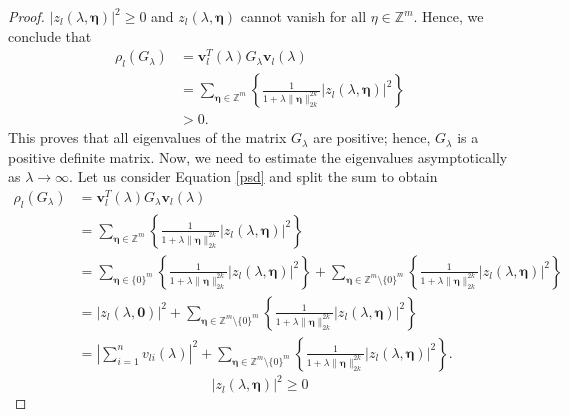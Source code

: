\documentclass[multixcb]{amstext-l}
\theoremstyle{plain}
\theoremstyle{definition}
\theoremstyle{definition}
\theoremstyle{remark}
\numberwithin{equation}{chapter}
\begin{document}
\begin{proof}
$\left|z_l(\lambda,\boldsymbol{\eta})\right|^2 \ge 0$ and $z_l(\lambda,\boldsymbol{\eta})$ cannot vanish for all $\eta\in\mathbb{Z}^m$. Hence, we conclude that
\begin{equation}\label{psd}
\begin{aligned}
   \rho_l(G_{\lambda}) &= \boldsymbol{v}_l^T(\lambda)G_{\lambda}\boldsymbol{v}_l(\lambda)\\
        &= \sum_{\boldsymbol{\eta}\in\mathbb{Z}^m}\left\{ \frac{1}{1+\lambda\|\boldsymbol{\eta}\|_{2k}^{2k}}\left|z_l(\lambda,\boldsymbol{\eta})\right|^2 \right\}\\
        &> 0.
\end{aligned}
\end{equation}
This proves that all eigenvalues of the matrix $G_{\lambda}$ are positive; hence, $G_{\lambda}$ is a positive definite matrix. Now, we need to estimate the eigenvalues asymptotically as $\lambda\to\infty$. Let us consider Equation \ref{psd} and split the sum to obtain
\begin{equation}\label{psd2}
\begin{aligned}
   \rho_l(G_{\lambda}) &= \boldsymbol{v}_l^T(\lambda)G_{\lambda}\boldsymbol{v}_l(\lambda)\\
        &= \sum_{\boldsymbol{\eta}\in\mathbb{Z}^m}\left\{ \frac{1}{1+\lambda\|\boldsymbol{\eta}\|_{2k}^{2k}}\left|z_l(\lambda,\boldsymbol{\eta})\right|^2 \right\}\\
            &= \sum_{\boldsymbol{\eta}\in\{0\}^m}\left\{ \frac{1}{1+\lambda\|\boldsymbol{\eta}\|_{2k}^{2k}}\left|z_l(\lambda,\boldsymbol{\eta})\right|^2 \right\} + \sum_{\boldsymbol{\eta}\in\mathbb{Z}^m\setminus\{0\}^m}\left\{ \frac{1}{1+\lambda\|\boldsymbol{\eta}\|_{2k}^{2k}}\left|z_l(\lambda,\boldsymbol{\eta})\right|^2 \right\}\\
            &= \left|z_l(\lambda,\boldsymbol{0})\right|^2 + \sum_{\boldsymbol{\eta}\in\mathbb{Z}^m\setminus\{0\}^m}\left\{ \frac{1}{1+\lambda\|\boldsymbol{\eta}\|_{2k}^{2k}}\left|z_l(\lambda,\boldsymbol{\eta})\right|^2 \right\}\\
        &= \left|\sum\limits_{i=1}^nv_{li}(\lambda)\right| ^2 + \sum_{\boldsymbol{\eta}\in\mathbb{Z}^m\setminus\{0\}^m}\left\{ \frac{1}{1+\lambda\|\boldsymbol{\eta}\|_{2k}^{2k}}\left|z_l(\lambda,\boldsymbol{\eta})\right|^2 \right\}.   
\end{aligned}
\end{equation}
\begin{equation}\label{seq_1}
 \left|z_l(\lambda,\boldsymbol{\eta})\right|^2 \ge 0
 \end{equation}\begin{equation}\label{proof_lambda}

\end{equation}
\end{proof}
\end{document}
